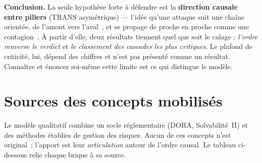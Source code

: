 \documentclass[11pt,a4paper]{article}
\begin{document}
\begin{cle}
\textbf{Conclusion.} La seule hypothèse forte à défendre est la \textbf{direction causale
entre piliers} (TRANS asymétrique) --- l'idée qu'une attaque suit une chaîne orientée, de
l'amont vers l'aval~\cite{Hutchins2011}, et se propage de proche en proche comme une
contagion~\cite{HillairetLopez2021}. À partir d'elle, deux résultats tiennent quel que soit
le calage : \emph{l'ordre renverse le verdict} et \emph{le classement des cascades les plus
critiques}. Le plafond de criticité, lui, dépend des chiffres et n'est pas présenté comme un
résultat. Connaître et énoncer soi-même cette limite est ce qui distingue le modèle.
\end{cle}

\section{Sources des concepts mobilisés}

Le modèle qualitatif combine un socle réglementaire (DORA, Solvabilité~II) et des méthodes
établies de gestion des risques. Aucun de ces concepts n'est original~; l'apport est leur
\emph{articulation} autour de l'ordre causal. Le tableau ci-dessous relie chaque brique à sa
source.
\end{document}
